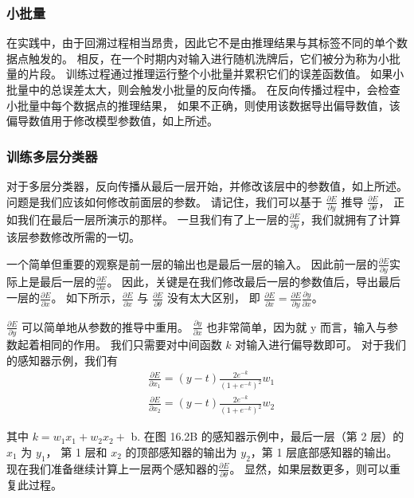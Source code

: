 \subsubsection{小批量}
在实践中，由于回溯过程相当昂贵，因此它不是由推理结果与其标签不同的单个数据点触发的。 
相反，在一个时期内对输入进行随机洗牌后，它们被分为称为小批量的片段。 
训练过程通过推理运行整个小批量并累积它们的误差函数值。 如果小批量中的总误差太大，则会触发小批量的反向传播。 
在反向传播过程中，会检查小批量中每个数据点的推理结果，
如果不正确，则使用该数据导出偏导数值，该偏导数值用于修改模型参数值，如上所述。

\subsubsection{训练多层分类器}
对于多层分类器，反向传播从最后一层开始，并修改该层中的参数值，如上所述。 问题是我们应该如何修改前面层的参数。 
请记住，我们可以基于 $\frac{\partial E}{\partial y}$ 推导 $\frac{\partial E}{\partial \theta}$，
正如我们在最后一层所演示的那样。 
一旦我们有了上一层的$\frac{\partial E}{\partial y}$，我们就拥有了计算该层参数修改所需的一切。

一个简单但重要的观察是前一层的输出也是最后一层的输入。 
因此前一层的$\frac{\partial E}{\partial y}$实际上是最后一层的$\frac{\partial E}{\partial x}$。 
因此，关键是在我们修改最后一层的参数值后，导出最后一层的$\frac{\partial E}{\partial x}$。 
如下所示，$\frac{\partial E}{\partial x}$ 与 $\frac{\partial E}{\partial \theta}$ 没有太大区别，
即 $\frac{\partial E}{\partial x}=\frac{\partial E}{\partial y}\frac{\partial y}{\partial x}$。

$\frac{\partial E}{\partial y}$ 可以简单地从参数的推导中重用。 
$\frac{\partial y}{\partial x}$ 也非常简单，因为就 $\mathrm{y}$ 而言，输入与参数起着相同的作用。 
我们只需要对中间函数 $k$ 对输入进行偏导数即可。 对于我们的感知器示例，我们有
$$
\begin{aligned}
& \frac{\partial E}{\partial x_{1}}=(y-t) \frac{2 e^{-k}}{\left(1+e^{-k}\right)^{2} } w_{1} \\
& \frac{\partial E}{\partial x_{2}}=(y-t) \frac{2 e^{-k}}{\left(1+e^{-k}\right)^{2} } w_{2}
\end{aligned}
$$

其中 $k=w_{1} x_{1}+w_{2} x_{2}+$ b. 在图 16.2B 的感知器示例中，最后一层（第 2 层）的 $x_{1}$ 为 $y_{1}$，
第 1 层和 $x_{2}$ 的顶部感知器的输出为 $y_ {2}$，第 1 层底部感知器的输出。 
现在我们准备继续计算上一层两个感知器的$\frac{\partial E}{\partial \theta}$。 显然，如果层数更多，则可以重复此过程。

